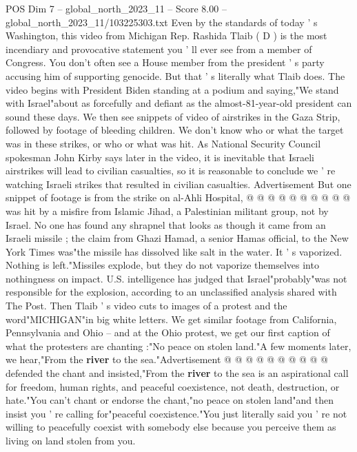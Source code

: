 \begin{textsample}{POS Dim 7 – global\_north\_2023\_11 – Score 8.00 – global\_north\_2023\_11/103225303.txt}  \label{ex:f7_pos_135}
Even by the standards of today ' s Washington, this video from Michigan Rep.
Rashida Tlaib ( D ) is the most incendiary and provocative statement you ' ll ever see from a member of Congress.
You don't often see a House member from the president ' s party accusing him of supporting genocide.
But that ' s literally what Tlaib does.
The video begins with President Biden standing at a podium and saying,"We stand with Israel"about as forcefully and defiant as the almost-81-year-old president can sound these days.
We then see snippets of video of airstrikes in the Gaza Strip, followed by footage of bleeding children.
We don't know who or what the target was in these strikes, or who or what was hit.
As National Security Council spokesman John Kirby says later in the video, it is inevitable that Israeli airstrikes will lead to civilian casualties, so it is reasonable to conclude we ' re watching Israeli strikes that resulted in civilian casualties.
Advertisement But one snippet of footage is from the strike on al-Ahli Hospital, @ @ @ @ @ @ @ @ @ @ was hit by a misfire from Islamic Jihad, a Palestinian militant group, not by Israel.
No one has found any shrapnel that looks as though it came from an Israeli missile ; the claim from Ghazi Hamad, a senior Hamas official, to the New York Times was"the missile has dissolved like salt in the water.
It ' s vaporized.
Nothing is left."Missiles explode, but they do not vaporize themselves into nothingness on impact.
U.S. intelligence has judged that Israel"probably"was not responsible for the explosion, according to an unclassified analysis shared with The Post.
Then Tlaib ' s video cuts to images of a protest and the word"MICHIGAN"in big white letters.
We get similar footage from California, Pennsylvania and Ohio -- and at the Ohio protest, we get our first caption of what the protesters are chanting :"No peace on stolen land."A few moments later, we hear,"From the \textbf{river} to the sea."Advertisement @ @ @ @ @ @ @ @ @ @ defended the chant and insisted,"From the \textbf{river} to the sea is an aspirational call for freedom, human rights, and peaceful coexistence, not death, destruction, or hate."You can't chant or endorse the chant,"no peace on stolen land"and then insist you ' re calling for"peaceful coexistence."You just literally said you ' re not willing to peacefully coexist with somebody else because you perceive them as living on land stolen from you.

\end{textsample}

